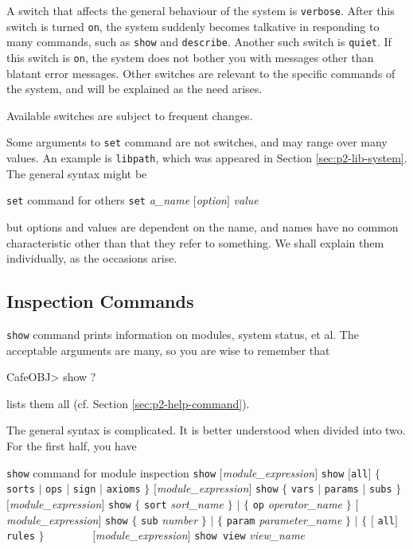 \documentclass[a4paper]{memoir}
\begin{document}
A switch that affects the general behaviour of the system is
\verb|verbose|. After this switch is turned \verb|on|, the system suddenly
becomes talkative in responding to many commands, such as \verb|show| and
\verb|describe|.
Another such switch is \verb|quiet|. If this switch is \verb|on|,
the system does not bother you with messages other than blatant error messages.
Other switches are relevant to the specific commands of the system,
and will be explained as the need arises.

\begin{warning}
  Available switches are subject to frequent changes.
\end{warning}

Some arguments to \verb|set| command are not switches, and may range
over many values. An example is \verb|libpath|, which was appeared
in Section \ref{sec:p2-lib-system}. The general syntax might be

\begin{bsyntax} \texttt{set} command for others  \Hline
\texttt{set} \textit{a\_name} $[$\textit{option}$]$ \textit{value}
\end{bsyntax}

but options and values are dependent on the name, and names have no
common characteristic other than that they refer to something.
We shall explain them individually, as the occasions arise.

\subsection{Inspection Commands}\label{sec:p2-show-command}

\verb|show| command prints information on modules, system status, et al.
The acceptable arguments are many, so you are wise to remember that
\begin{vvtm}
\begin{ccode}
  CafeOBJ> show ?
\end{ccode}
\end{vvtm}
lists them all (cf. Section \ref{sec:p2-help-command}).

The general syntax is complicated. It is better understood
when divided into two. For the first half, you have

\begin{bsyntax} \texttt{show} command for module inspection\Hline
{}
\texttt{show} $[$\textit{module\_expression}$]$
\texttt{show} $[$\texttt{all}$]$ $\{$ \texttt{sorts} $|$ \texttt{ops} $|$ \texttt{sign} $|$ \texttt{axioms} $\}$ $[$\textit{module\_expression}$]$
\texttt{show} $\{$ \texttt{vars} $|$ \texttt{params} $|$ \texttt{subs} $\}$ $[$\textit{module\_expression}$]$
\texttt{show} $\{$ \texttt{sort} \textit{sort\_name} $\}$ $|$ $\{$ \texttt{op} \textit{operator\_name} $\}$ $[$ \textit{module\_expression}$]$
\texttt{show} $\{$ \texttt{sub} \textit{number} $\}$ $|$ $\{$ \texttt{param} \textit{parameter\_name} $\}$ $|$ $\{$ $[$ \texttt{all}$]$ \texttt{rules} $\}$ 
~~~~~~~~$[$\textit{module\_expression}$]$
\texttt{show view} \textit{view\_name}
\end{bsyntax}
\end{document}
